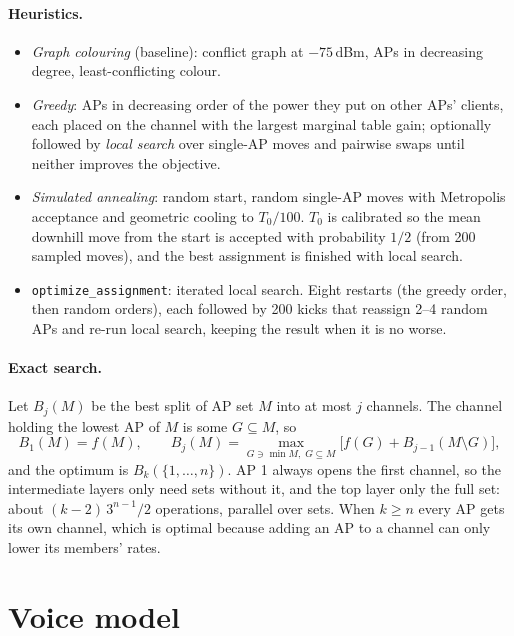 \documentclass[10pt]{article}
\newcommand{\code}[1]{\texttt{#1}}
\begin{document}
\paragraph{Heuristics.}
\begin{itemize}
\item \emph{Graph colouring} (baseline): conflict graph at $-75$\,dBm, APs in decreasing degree, least-conflicting colour.
\item \emph{Greedy}: APs in decreasing order of the power they put on other APs' clients, each placed on the channel with
  the largest marginal table gain; optionally followed by \emph{local search} over single-AP moves and pairwise swaps until
  neither improves the objective.
\item \emph{Simulated annealing}: random start, random single-AP moves with Metropolis acceptance and geometric cooling to
  $T_0/100$. $T_0$ is calibrated so the mean downhill move from the start is accepted with probability $1/2$ (from 200
  sampled moves), and the best assignment is finished with local search.
\item \code{optimize\_assignment}: iterated local search. Eight restarts (the greedy order, then random orders), each
  followed by 200 kicks that reassign 2--4 random APs and re-run local search, keeping the result when it is no worse.
\end{itemize}

\paragraph{Exact search.}
Let $B_j(M)$ be the best split of AP set $M$ into at most $j$ channels. The channel holding the lowest AP of $M$ is some
$G \subseteq M$, so
\[
  B_1(M) = f(M), \qquad B_j(M) = \max_{G \ni \min M,\; G \subseteq M} \big[f(G) + B_{j-1}(M \setminus G)\big],
\]
and the optimum is $B_k(\{1,\dots,n\})$. AP 1 always opens the first channel, so the intermediate layers only need sets
without it, and the top layer only the full set: about $(k-2)\,3^{n-1}/2$ operations, parallel over sets. When $k \ge n$
every AP gets its own channel, which is optimal because adding an AP to a channel can only lower its members' rates.

\section{Voice model}
\end{document}
